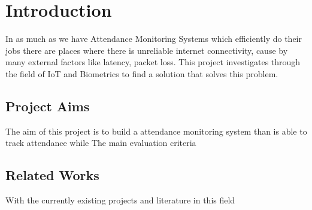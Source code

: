 \chapter{Introduction}

In as much as we have Attendance Monitoring Systems which efficiently do their jobs there are places where there is unreliable internet connectivity, cause by many external factors like latency, packet loss. This project investigates through the field of IoT and Biometrics to find a solution that solves this problem.


\section{Project Aims}

The aim of this project is to build a attendance monitoring system than is able to track attendance while 
The main evaluation criteria

\section{Related Works} 






With the currently existing projects and literature in this field
